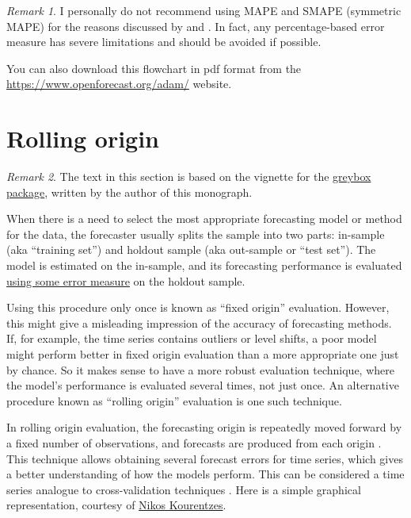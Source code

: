 \documentclass[
]{book}
\theoremstyle{definition}
\theoremstyle{definition}
\theoremstyle{definition}
\theoremstyle{definition}
\theoremstyle{remark}
\newtheorem*{remark}{Remark}
\begin{document}
\begin{remark}
I personally do not recommend using MAPE and SMAPE (symmetric MAPE) for the reasons discussed by \citet{Goodwin1999} and \citet{Hyndman2006}. In fact, any percentage-based error measure has severe limitations and should be avoided if possible.
\end{remark}

You can also download this flowchart in pdf format from the \href{https://www.openforecast.org/adam/images/errorMeasuresFlowChart-v2.pdf}{https://www.openforecast.org/adam/} website.

\hypertarget{rollingOrigin}{%
\section{Rolling origin}\label{rollingOrigin}}

\begin{remark}
The text in this section is based on the vignette for the \href{https://cran.r-project.org/package=greybox}{greybox package}, written by the author of this monograph.
\end{remark}

When there is a need to select the most appropriate forecasting model or method for the data, the forecaster usually splits the sample into two parts: in-sample (aka ``training set'') and holdout sample (aka out-sample or ``test set''). The model is estimated on the in-sample, and its forecasting performance is evaluated \protect\hyperlink{errorMeasures}{using some error measure} on the holdout sample.

Using this procedure only once is known as ``fixed origin'' evaluation. However, this might give a misleading impression of the accuracy of forecasting methods. If, for example, the time series contains outliers or level shifts, a poor model might perform better in fixed origin evaluation than a more appropriate one just by chance. So it makes sense to have a more robust evaluation technique, where the model's performance is evaluated several times, not just once. An alternative procedure known as ``rolling origin'' evaluation is one such technique.

In rolling origin evaluation, the forecasting origin is repeatedly moved forward by a fixed number of observations, and forecasts are produced from each origin \citep{Tashman2000}. This technique allows obtaining several forecast errors for time series, which gives a better understanding of how the models perform. This can be considered a time series analogue to cross-validation techniques \citep{WikipediaCrossValidation2020}. Here is a simple graphical representation, courtesy of \href{https://kourentzes.com/forecasting/}{Nikos Kourentzes}.
\end{document}
